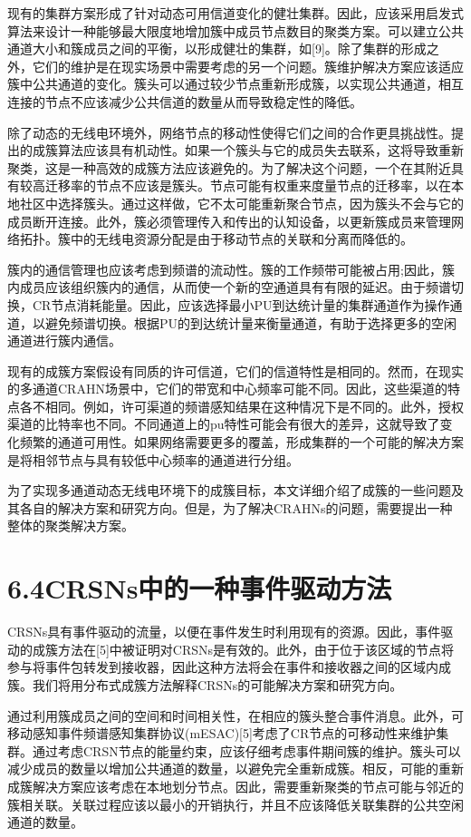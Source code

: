 \documentclass[a4paper,AutoFakeBold,oneside,12pt]{book}
\begin{document}
  现有的集群方案形成了针对动态可用信道变化的健壮集群。因此，应该采用启发式算法来设计一种能够最大限度地增加簇中成员节点数目的聚类方案。可以建立公共通道大小和簇成员之间的平衡，以形成健壮的集群，如[9]。除了集群的形成之外，它们的维护是在现实场景中需要考虑的另一个问题。簇维护解决方案应该适应簇中公共通道的变化。簇头可以通过较少节点重新形成簇，以实现公共通道，相互连接的节点不应该减少公共信道的数量从而导致稳定性的降低。

  除了动态的无线电环境外，网络节点的移动性使得它们之间的合作更具挑战性。提出的成簇算法应该具有机动性。如果一个簇头与它的成员失去联系，这将导致重新聚类，这是一种高效的成簇方法应该避免的。为了解决这个问题，一个在其附近具有较高迁移率的节点不应该是簇头。节点可能有权重来度量节点的迁移率，以在本地社区中选择簇头。通过这样做，它不太可能重新聚合节点，因为簇头不会与它的成员断开连接。此外，簇必须管理传入和传出的认知设备，以更新簇成员来管理网络拓扑。簇中的无线电资源分配是由于移动节点的关联和分离而降低的。

  簇内的通信管理也应该考虑到频谱的流动性。簇的工作频带可能被占用;因此，簇内成员应该组织簇内的通信，从而使一个新的空通道具有有限的延迟。由于频谱切换，CR节点消耗能量。因此，应该选择最小PU到达统计量的集群通道作为操作通道，以避免频谱切换。根据PU的到达统计量来衡量通道，有助于选择更多的空闲通道进行簇内通信。

  现有的成簇方案假设有同质的许可信道，它们的信道特性是相同的。然而，在现实的多通道CRAHN场景中，它们的带宽和中心频率可能不同。因此，这些渠道的特点各不相同。例如，许可渠道的频谱感知结果在这种情况下是不同的。此外，授权渠道的比特率也不同。不同通道上的pu特性可能会有很大的差异，这就导致了变化频繁的通道可用性。如果网络需要更多的覆盖，形成集群的一个可能的解决方案是将相邻节点与具有较低中心频率的通道进行分组。
  
  为了实现多通道动态无线电环境下的成簇目标，本文详细介绍了成簇的一些问题及其各自的解决方案和研究方向。但是，为了解决CRAHNs的问题，需要提出一种整体的聚类解决方案。
  
\section*{6.4\quad{}CRSNs中的一种事件驱动方法}

  
  CRSNs具有事件驱动的流量，以便在事件发生时利用现有的资源。因此，事件驱动的成簇方法在[5]中被证明对CRSNs是有效的。此外，由于位于该区域的节点将参与将事件包转发到接收器，因此这种方法将会在事件和接收器之间的区域内成簇。我们将用分布式成簇方法解释CRSNs的可能解决方案和研究方向。
  
  通过利用簇成员之间的空间和时间相关性，在相应的簇头整合事件消息。此外，可移动感知事件频谱感知集群协议(mESAC)[5]考虑了CR节点的可移动性来维护集群。通过考虑CRSN节点的能量约束，应该仔细考虑事件期间簇的维护。簇头可以减少成员的数量以增加公共通道的数量，以避免完全重新成簇。相反，可能的重新成簇解决方案应该考虑在本地划分节点。因此，需要重新聚类的节点可能与邻近的簇相关联。关联过程应该以最小的开销执行，并且不应该降低关联集群的公共空闲通道的数量。
  
\end{document}
